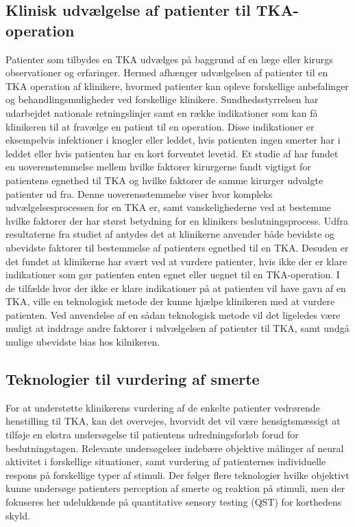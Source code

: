 \subsection{Klinisk udvælgelse af patienter til TKA-operation}


Patienter som tilbydes en TKA udvælges på baggrund af en læge eller kirurgs observationer og erfaringer.
Hermed afhænger udvælgelsen af patienter til en TKA operation af klinikere, hvormed patienter kan opleve forskellige anbefalinger og behandlingsmuligheder ved forskellige klinikere. Sundhedsstyrrelsen har udarbejdet nationale retningslinjer samt en række indikationer som kan få klinikeren til at fravælge en patient til en operation. Disse indikationer er eksempelvis infektioner i knogler eller leddet, hvis patienten ingen smerter har i leddet eller hvis patienten har en kort forventet levetid. 
Et studie af \cite{skou2016} har fundet en uoverenstemmelse mellem hvilke faktorer kirurgerne fandt vigtigst for patientens egnethed til TKA og hvilke faktorer de samme kirurger udvalgte patienter ud fra. Denne uoverensstemmelse viser hvor kompleks udvælgelsesprocessen for en TKA er, samt vanskelighederne ved at bestemme hvilke faktorer der har størst betydning for en klinikers beslutningsprocess. Udfra resultaterne fra studiet af \cite{skou2016} antydes det at klinikerne anvender både bevidste og ubevidste faktorer til bestemmelse af patienters egnethed til en TKA. Desuden er det fundet at klinikerne har svært ved at vurdere patienter, hvis ikke der er klare indikationer som gør patienten enten egnet eller uegnet til en TKA-operation. 
I de tilfælde hvor der ikke er klare indikationer på at patienten vil have gavn af en TKA, ville en teknologisk metode der kunne hjælpe klinikeren med at vurdere patienten. Ved anvendelse af en sådan teknologisk metode vil det ligeledes være muligt at inddrage andre faktorer i udvælgelsen af patienter til TKA, samt undgå mulige ubevidste bias hos kilnikeren. 

\subsection{Teknologier til vurdering af smerte}
For at understøtte klinikerens vurdering af de enkelte patienter vedrørende henstilling til TKA, kan det overvejes, hvorvidt det vil være hensigtsmæssigt at tilføje en ekstra undersøgelse til patientens udredningsforløb forud for beslutningstagen. Relevante undersøgelser indebære objektive målinger af neural aktivitet i forskellige situationer, samt vurdering af patienternes individuelle respons på forskellige typer af stimuli. Der følger flere teknologier hvilke objektivt kunne undersøge patienters perception af smerte og reaktion på stimuli, men der fokuseres her udelukkende på quantitative sensory testing (QST) for korthedens skyld. 

